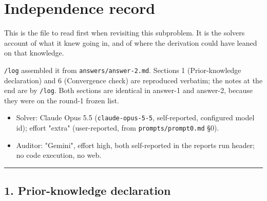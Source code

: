 \documentclass[11pt,a4paper]{article}
\providecommand{\passthrough}[1]{#1}
\providecommand{\tightlist}{\setlength{\itemsep}{0pt}\setlength{\parskip}{0pt}}
\begin{document}
\section{Independence record}\label{app:independence}
\hypertarget{independence-record-p003.s01}{%
}

This is the file to read first when revisiting this subproblem. It is the solver\textquotesingle s account of what it knew going in, and of where the derivation could have leaned on that knowledge.

\passthrough{\lstinline!/log!} assembled it from \passthrough{\lstinline!answers/answer-2.md!}. Sections 1 (Prior-knowledge declaration) and 6 (Convergence check) are reproduced verbatim; the notes at the end are by \passthrough{\lstinline!/log!}. Both sections are identical in answer-1 and answer-2, because they were on the round-1 frozen list.

\begin{itemize}
\tightlist
\item
  Solver: Claude Opus 5.5 (\passthrough{\lstinline!claude-opus-5-5!}, self-reported, configured model id); effort "extra" (user-reported, from \passthrough{\lstinline!prompts/prompt0.md!} §0).
\item
  Auditor: "Gemini", effort high, both self-reported in the report\textquotesingle s run header; no code execution, no web.
\end{itemize}

\begin{center}\rule{0.5\linewidth}{0.5pt}\end{center}

\hypertarget{prior-knowledge-declaration}{%
\subsection{1. Prior-knowledge declaration}\label{prior-knowledge-declaration}}
\end{document}
